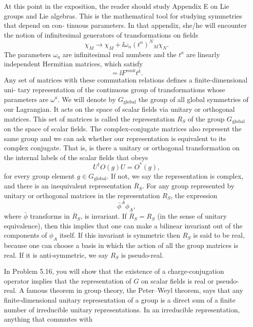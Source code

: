 At this point in the exposition, the reader should study Appendix E on Lie groups and
Lie algebras. This is the mathematical tool for studying symmetries that depend on con-
tinuous parameters. In that appendix, she/he will encounter the notion of infinitesimal
generators of transformations on fields
\begin{equation*}
  \chi_M\longrightarrow\chi_M+\ii\omega_n(t^n)^N{}_M\chi_N.
\end{equation*}
The parameters $\omega_a$ are infinitesimal real numbers and the $t^a$ are linearly independent
Hermitian matrices, which satisfy
\begin{equation*}
  [t^m,t^n]=\ii F^{mnk}t^k.
\end{equation*}
Any set of matrices with these commutation relations defines a finite-dimensional uni-
tary representation of the continuous group of transformations whose parameters are
$\omega^a$. We will denote by $G_{\mathrm{global}}$ the group of all global symmetries of our Lagrangian. It
acts on the space of scalar fields via unitary or orthogonal matrices. This set of matrices
is called the representation $R_S$ of the group $G_{\mathrm{global}}$ on the space of scalar fields. The
complex-conjugate matrices also represent the same group and we can ask whether
our representation is equivalent to its complex conjugate. That is, is there a unitary or
orthogonal transformation on the internal labels of the scalar fields that obeys
\begin{equation*}
  U^\dagger O(g)U=O^*(g),
\end{equation*}
for every group element $g\in G_{\mathrm{global}}$. If not, we say the representation is complex, and
there is an inequivalent representation $\overline R_S$. For any group represented by unitary or
orthogonal matrices in the representation $R_S$, the expression
\begin{equation*}
  \bar\phi^A\phi_A,
\end{equation*}
where $\bar\phi$ transforms in $\overline R_S$, is invariant. If $\overline R_S=R_S$ (in the sense of unitary equivalence),
then this implies that one can make a bilinear invariant out of the components of $\phi_A$
itself. If this invariant is symmetric then $R_S$ is said to be real, because one can choose
a basis in which the action of all the group matrices is real. If it is anti-symmetric, we
say $R_S$ is pseudo-real.

In Problem 5.16, you will show that the existence of a charge-conjugation operator
implies that the representation of $G$ on scalar fields is real or pseudo-real. A famous
theorem in group theory, the Peter--Weyl theorem, says that any finite-dimensional
unitary representation of a group is a direct sum of a finite number of irreducible
unitary representations. In an irreducible representation, anything that commutes with

